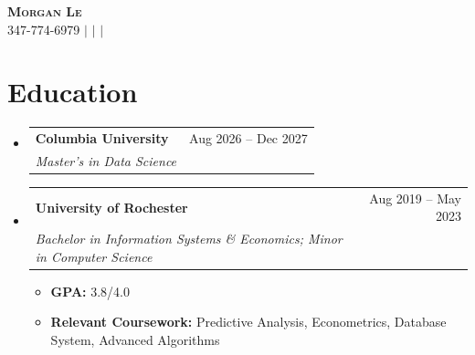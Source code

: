 \documentclass[a4paper,11pt]{article}
\makeatletter
\newcommand{\resumeItem}[1]{
  \item\small{
    {#1\par\vspace{-2pt}}
  }
}
\newcommand{\resumeSubheading}[4]{
  \vspace{-2pt}\item
    \begin{tabular*}{0.97\textwidth}[t]{l@{\extracolsep{\fill}}r}
      \textbf{#1} & #2 \\
      \textit{\small#3} & \textit{\small #4} \\
    \end{tabular*}\vspace{-7pt}
}
\newcommand{\resumeSubHeadingListStart}{\begin{itemize}[leftmargin=0.15in, label={}]}
\newcommand{\resumeSubHeadingListEnd}{\end{itemize}}
\newcommand{\resumeItemListStart}{\begin{itemize}}
\newcommand{\resumeItemListEnd}{\end{itemize}\vspace{-5pt}}
\makeatother
\begin{document}
\begin{center}
    \textbf{\Huge \scshape Morgan Le} \\ \vspace{1pt}
    \small 347-774-6979 $|$
    \href{mailto:ml5536@columbia.edu}{\underline{}} $|$
    \href{https://www.linkedin.com/in/morganhle/}{\underline{}} $|$
    \href{https://lhnminh.github.io/}{\underline{}}
\end{center}

\section{Education}
\resumeSubHeadingListStart
  \resumeSubheading
    {Columbia University}{Aug 2026 -- Dec 2027}
    {Master's in Data Science}{}
  \resumeSubheading
    {University of Rochester}{Aug 2019 -- May 2023}
    {Bachelor in Information Systems \& Economics; Minor in Computer Science}{}
    \resumeItemListStart
      \resumeItem{\textbf{GPA:} 3.8/4.0}
      \resumeItem{\textbf{Relevant Coursework:} Predictive Analysis, Econometrics, Database System, Advanced Algorithms}
    \resumeItemListEnd
\resumeSubHeadingListEnd
\end{document}
